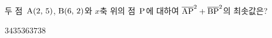 두 점~$\mathrm{A}(2,\mkern3mu 5)$, $\mathrm{B}(6,\mkern3mu 2)$와 $x$축 위의 점~$\mathrm{P}$에 대하여 $\overline{\mathrm{AP}}^2+\overline{\mathrm{BP}}^2$의 최솟값은?
\begin{choices32}{$34$}{$35$}{$36$}{$37$}{$38$}\end{choices32}
